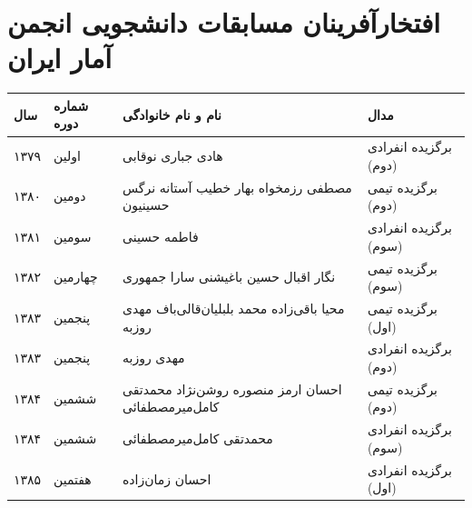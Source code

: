 \documentclass[
  letterpaper,
  DIV=11,
  numbers=noendperiod]{scrreprt}
\newcounter{none} %
\begin{document}
\section{افتخارآفرینان مسابقات دانشجویی انجمن آمار
ایران}\label{ux627ux641ux62aux62eux627ux631ux622ux641ux631ux6ccux646ux627ux646-ux645ux633ux627ux628ux642ux627ux62a-ux62fux627ux646ux634ux62cux648ux6ccux6cc-ux627ux646ux62cux645ux646-ux622ux645ux627ux631-ux627ux6ccux631ux627ux646}

{\def\LTcaptype{none} %
\begin{longtable}[]{@{}
  >{\raggedright\arraybackslash}p{}
  >{\raggedright\arraybackslash}p{}
  >{\raggedright\arraybackslash}p{}
  >{\raggedright\arraybackslash}p{}@{}}
\toprule\noalign{}
\begin{minipage}[b]{\linewidth}\raggedright
سال
\end{minipage} & \begin{minipage}[b]{\linewidth}\raggedright
شماره دوره
\end{minipage} & \begin{minipage}[b]{\linewidth}\raggedright
نام و نام خانوادگی
\end{minipage} & \begin{minipage}[b]{\linewidth}\raggedright
مدال
\end{minipage} \\
\midrule\noalign{}
\endhead
\bottomrule\noalign{}
\endlastfoot
۱۳۷۹ & اولین & هادی جباری نوقابی & برگزیده انفرادی (دوم) \\
۱۳۸۰ & دومین & مصطفی رزمخواه بهار خطیب آستانه نرگس حسینیون & برگزیده
تیمی (دوم) \\
۱۳۸۱ & سومین & فاطمه حسینی & برگزیده انفرادی (سوم) \\
۱۳۸۲ & چهارمین & نگار اقبال حسین باغیشنی سارا جمهوری & برگزیده تیمی
(سوم) \\
۱۳۸۳ & پنجمین & محیا باقی‌زاده محمد بلبلیان‌قالی‌باف مهدی روزبه & برگزیده
تیمی (اول) \\
۱۳۸۳ & پنجمین & مهدی روزبه & برگزیده انفرادی (دوم) \\
۱۳۸۴ & ششمین & احسان ارمز منصوره روشن‌‌نژاد محمدتقی کامل‌میرمصطفائی &
برگزیده تیمی (دوم) \\
۱۳۸۴ & ششمین & محمدتقی کامل‌میرمصطفائی & برگزیده انفرادی (سوم) \\
۱۳۸۵ & هفتمین & احسان زمان‏‌زاده & برگزیده انفرادی (اول) \\

\end{longtable}}
\end{document}
